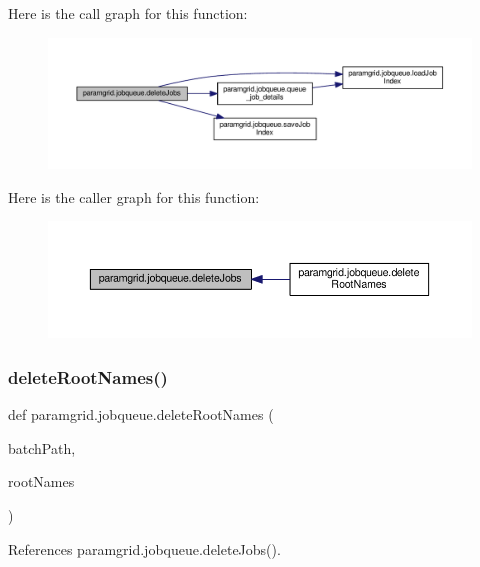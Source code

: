 Here is the call graph for this function\+:
\nopagebreak
\begin{figure}[H]
\begin{center}
\leavevmode
\includegraphics[width=350pt]{namespaceparamgrid_1_1jobqueue_a6fbbd25249531a7a6197d5ffe37d164e_cgraph}
\end{center}
\end{figure}
Here is the caller graph for this function\+:
\nopagebreak
\begin{figure}[H]
\begin{center}
\leavevmode
\includegraphics[width=350pt]{namespaceparamgrid_1_1jobqueue_a6fbbd25249531a7a6197d5ffe37d164e_icgraph}
\end{center}
\end{figure}
\mbox{\label{namespaceparamgrid_1_1jobqueue_a3c9cbe684a6be879c4a25253e6e9dafe}} 
\subsubsection{\texorpdfstring{delete\+Root\+Names()}{deleteRootNames()}}
{\footnotesize\ttfamily def paramgrid.\+jobqueue.\+delete\+Root\+Names (\begin{DoxyParamCaption}\item[{}]{batch\+Path,  }\item[{}]{root\+Names }\end{DoxyParamCaption})}



References paramgrid.\+jobqueue.\+delete\+Jobs().

